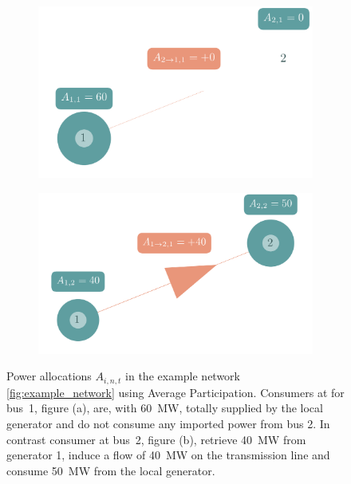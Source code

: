 \documentclass[11pt,twocolumn]{article}
\newcommand{\allocatestate}[1][i, n]{A_{#1,t}}
\begin{document}
\begin{figure}[h!]
    \begin{subfigure}[c]{.495\linewidth}
    \includegraphics[width=\linewidth]{example_allocation_bus1_net_ptpf.png}
    \vspace{-40pt}
    \subcaption{}
    \label{fig:example_allocation_bus1}
    \end{subfigure}
    \begin{subfigure}[c]{.495\linewidth}
    \includegraphics[width=\linewidth]{example_allocation_bus2_net_ptpf.png}
    \vspace{-40pt}
    \subcaption{}
    \label{fig:example_allocation_bus2}
    \end{subfigure}
    \caption{Power allocations $\allocatestate$ in the example network \cref{fig:example_network} using Average Participation. Consumers at for bus~1, figure (a), are, with 60~MW, totally supplied by the local generator and do not consume any imported power from bus 2. In contrast consumer at bus~2, figure (b), retrieve 40~MW from generator 1, induce a flow of 40~MW on the transmission line and consume 50~MW from the local generator.}
    \label{fig:example_allocation}
\end{figure}
\end{document}

